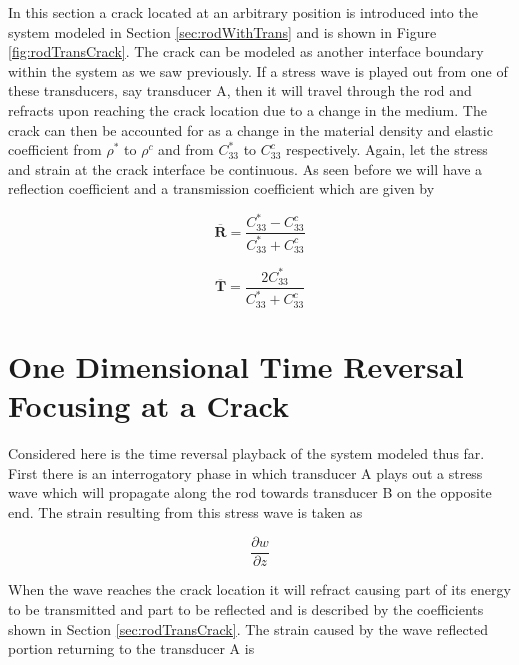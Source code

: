 In this section a crack located at an arbitrary position is introduced into the system modeled in Section \ref{sec:rodWithTrans} and is shown in Figure \ref{fig:rodTransCrack}. The crack can be modeled as another interface boundary within the system as we saw previously. If a stress wave is played out from one of these transducers, say transducer A, then it will travel through the rod and refracts upon reaching the crack location due to a change in the medium. The crack can then be accounted for as a change in the material density and elastic coefficient from $\rho ^*$ to $\rho ^c$ and from $C^*_{33}$ to $C^c_{33}$ respectively. Again, let the stress and strain at the crack interface be continuous. As seen before we will have a reflection coefficient and a transmission coefficient which are given by

 \begin{equation}
 \boldsymbol{\overline{R}} = \frac{C^*_{33} - C^c_{33}}{C^*_{33} + C^c_{33}}
 \end{equation}
 
  \begin{equation}
  \boldsymbol{\overline{T}} = \frac{2C^*_{33}}{C^*_{33} + C^c_{33}}
  \end{equation}
  
  
  
  \section{One Dimensional Time Reversal Focusing at a Crack}
  Considered here is the time reversal playback of the system modeled thus far. First there is an interrogatory phase in which transducer A plays out a stress wave which will propagate along the rod towards transducer B on the opposite end. The strain resulting from this stress wave is taken as
  
  \begin{equation}
  \frac{\partial w}{\partial z}
  \end{equation}
  
  
  When the wave reaches the crack location it will refract causing part of its energy to be transmitted and part to be reflected and is described by the coefficients shown in Section \ref{sec:rodTransCrack}. The strain caused by the wave reflected portion returning to the transducer A is
  
